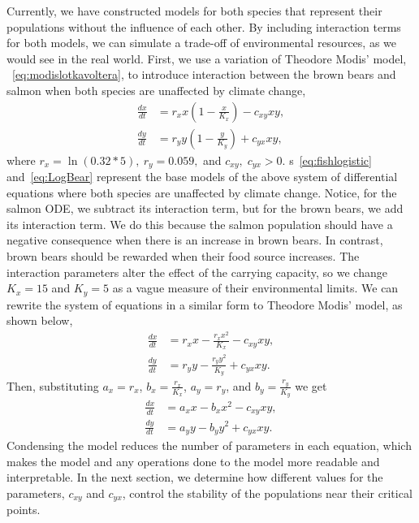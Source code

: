 Currently, we have constructed models for both species that represent their populations without the influence of each other. 
By including interaction terms for both models, we can simulate a trade-off of environmental resources, as we would see in the real world.
First, we use a variation of Theodore Modis' model, \equationautorefname~\eqref{eq:modislotkavoltera}, to introduce interaction between the brown bears and salmon when both species are unaffected by climate change,
\begin{equation}\label{eq:AutonomousSystemODEs}
    \begin{aligned}
    \frac{dx}{dt} &=r_xx\left(1-\frac{x}{K_x}\right) - c_{xy}xy,\\[.4cm]
    \frac{dy}{dt} &=r_yy\left(1-\frac{y}{K_y}\right) + c_{yx}xy,
    \end{aligned}
\end{equation}
where $r_x = \ln(0.32*5),\ r_y=0.059,$ and $c_{xy},\;c_{yx}>0$. \equationautorefname s~\eqref{eq:fishlogistic} and~\eqref{eq:LogBear} represent the base models of the above system of differential equations where both species are unaffected by climate change.
Notice, for the salmon ODE, we subtract its interaction term, but for the brown bears, we add its interaction term.
We do this because the salmon population should have a negative consequence when there is an increase in brown bears.
In contrast, brown bears should be rewarded when their food source increases.
The interaction parameters alter the effect of the carrying capacity, so we change $K_x = 15$ and $K_y=5$ as a vague measure of their environmental limits.
We can rewrite the system of equations in a similar form to Theodore Modis' model, as shown below,
\begin{equation}
    \begin{aligned}
    \frac{dx}{dt} &= r_xx -\frac{r_xx^2}{K_x} - c_{xy}xy,\\[.4cm]
    \frac{dy}{dt} &=r_yy -\frac{r_yy^2}{K_y} + c_{yx}xy.
    \end{aligned}
\end{equation}
Then, substituting $ a_x = r_x$, $\displaystyle b_x = \frac{r_x}{K_x}$, $a_y = r_y$, and $\displaystyle b_y = \frac{r_y}{K_y}$ we get
\begin{equation}\label{eq:AutonomousSystemODEsModis}
    \begin{aligned}
    \frac{dx}{dt} &= a_xx - b_xx^2 - c_{xy}xy,\\
    \frac{dy}{dt} &= a_yy - b_yy^2 + c_{yx}xy.
    \end{aligned}
\end{equation}
Condensing the model reduces the number of parameters in each equation, which makes the model and any operations done to the model more readable and interpretable.
In the next section, we determine how different values for the parameters, $c_{xy}$ and $c_{yx}$, control the stability of the populations near their critical points.
